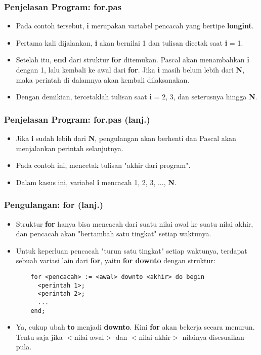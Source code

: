 \begin{frame}
\frametitle{Penjelasan Program: for.pas}
\begin{itemize}
  \item Pada contoh tersebut, \textbf{i} merupakan variabel pencacah yang bertipe \textbf{longint}.
  \item Pertama kali dijalankan, \textbf{i} akan bernilai 1 dan tulisan dicetak saat \textbf{i} = 1.
  \item Setelah itu, \textbf{end} dari struktur \textbf{for} ditemukan. Pascal akan menambahkan \textbf{i} dengan 1, lalu kembali ke awal dari \textbf{for}. Jika \textbf{i} masih belum lebih dari \textbf{N}, maka perintah di dalamnya akan kembali dilaksanakan.
  \item Dengan demikian, tercetaklah tulisan saat \textbf{i} = 2, 3, dan seterusnya hingga \textbf{N}.
\end{itemize}
\end{frame}

\begin{frame}
\frametitle{Penjelasan Program: for.pas (lanj.)}
\begin{itemize}
  \item Jika \textbf{i} sudah lebih dari \textbf{N}, pengulangan akan berhenti dan Pascal akan menjalankan perintah selanjutnya.
  \item Pada contoh ini, mencetak tulisan "akhir dari program".
  \item Dalam kasus ini, variabel \textbf{i} mencacah 1, 2, 3, ..., \textbf{N}.
\end{itemize}
\end{frame}

\begin{frame}[fragile]
\frametitle{Pengulangan: for (lanj.)}
\begin{itemize}
  \item Struktur \textbf{for} hanya bisa mencacah dari suatu nilai awal ke suatu nilai akhir, dan pencacah akan "bertambah satu tingkat" setiap waktunya.
  \item Untuk keperluan pencacah "turun satu tingkat" setiap waktunya, terdapat sebuah variasi lain dari \textbf{for}, yaitu \textbf{for downto} dengan struktur:
  \begin{lstlisting}
    for <pencacah> := <awal> downto <akhir> do begin
      <perintah 1>;
      <perintah 2>;
      ...
    end;
  \end{lstlisting}
  \item Ya, cukup ubah \alert{\textbf{to}} menjadi \alert{\textbf{downto}}. Kini \textbf{for} akan bekerja secara menurun. Tentu saja jika $<$nilai awal$>$ dan $<$nilai akhir$>$ nilainya disesuaikan pula.
\end{itemize}
\end{frame}

